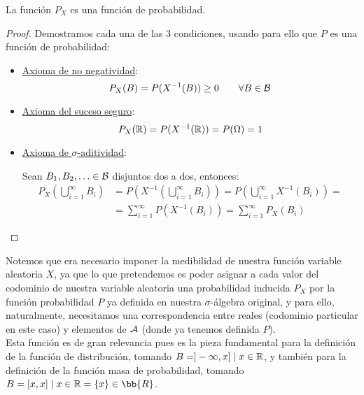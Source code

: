 \begin{prop}
    La función $P_X$ es una función de probabilidad.
\end{prop}
\begin{proof} Demostramos cada una de las 3 condiciones,
    usando para ello que $P$ es una función de probabilidad:
    \begin{itemize}
        \item \ul{Axioma de no negatividad}:
              $$P_X(B) = P(X^{-1}(B)) \geq 0 \qquad \forall B \in \mathcal{B}$$
        \item \ul{Axioma del suceso seguro}:
              $$P_X(\mathbb R) = P(X^{-1}(\mathbb R)) = P(\Omega) = 1$$
        \item \ul{Axioma de $\sigma$-aditividad}:
        
        Sean $B_1, B_2, \ldots \in \mathcal{B}$ disjuntos dos a dos, entonces:
        \begin{align*}
            P_X\left(\bigcup\limits_{i=1}^{\infty} B_i\right) &= P\left(X^{-1}\left(\bigcup_{i=1}^{\infty} B_i\right)\right) = P\left(\bigcup_{i=1}^{\infty} X^{-1}(B_i)\right) =\\&= \sum_{i=1}^{\infty} P(X^{-1}(B_i)) = \sum_{i=1}^{\infty} P_X(B_i)
        \end{align*}
    \end{itemize}
\end{proof}

Notemos que era necesario imponer la medibilidad de nuestra función variable aleatoria $X$, ya que lo que pretendemos es poder asignar a cada valor del codominio de nuestra variable aleatoria una probabilidad inducida $P_X$ por la función probabilidad $P$ ya definida en nuestra $\sigma$-álgebra original, y para ello, naturalmente, necesitamos una correspondencia entre reales (codominio particular en este caso) y elementos de $\mathcal{A}$ (donde ya tenemos definida $P$).\\

Esta función es de gran relevancia pues es la pieza fundamental para la definición de la función de distribución, tomando $B=]-\infty, x] \mid x \in \mathbb R$, y también para la definición de la función masa de probabilidad, tomando $B=[x,x] \mid x \in \R = \{x\}\in \bb{R}$.\\

